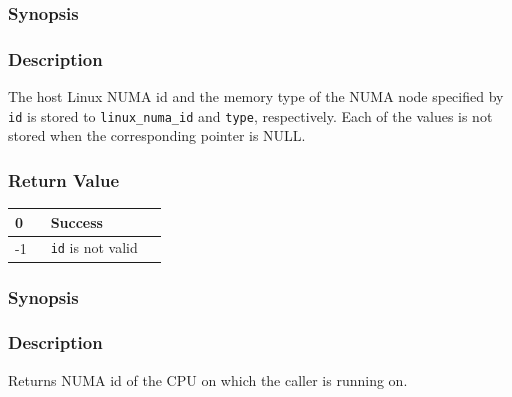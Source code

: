 \documentclass[twoside,11pt,fleqn]{book}
\begin{document}
\subsubsection{}
\subsubsection*{Synopsis}{\quad}
\begin{funcdef}
\end{funcdef}

\subsubsection*{Description}{\quad}
The host Linux NUMA id and the memory type of the NUMA node specified by \texttt{id} is stored to \texttt{linux\_numa\_id} and \texttt{type}, respectively. Each of the values is not stored when the corresponding pointer is NULL.

\subsubsection*{Return Value}{\quad}
\begin{table}[!h]
\footnotesize
\begin{tabular}{|p{0.20\linewidth}|p{0.66\linewidth}|} \hline
0&Success\\ \hline
-1&\texttt{id} is not valid\\ \hline
\end{tabular}
\vspace{-0em}
\end{table}
\FloatBarrier

\subsubsection{}
\subsubsection*{Synopsis}{\quad}

\subsubsection*{Description}{\quad}
Returns NUMA id of the CPU on which the caller is running on.
\end{document}
